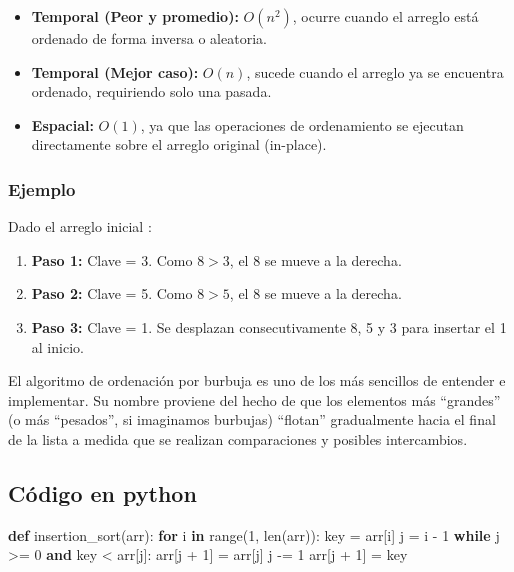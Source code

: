 \documentclass[
  spanish,
  letterpaper,
  DIV=11,
  numbers=noendperiod]{scrreprt}
\newenvironment{Shaded}{\begin{snugshade}}{\end{snugshade}}
\newcommand{\BuiltInTok}[1]{\textcolor[rgb]{0.00,0.23,0.31}{#1}}
\newcommand{\ControlFlowTok}[1]{\textcolor[rgb]{0.00,0.23,0.31}{\textbf{#1}}}
\newcommand{\DecValTok}[1]{\textcolor[rgb]{0.68,0.00,0.00}{#1}}
\newcommand{\KeywordTok}[1]{\textcolor[rgb]{0.00,0.23,0.31}{\textbf{#1}}}
\newcommand{\NormalTok}[1]{\textcolor[rgb]{0.00,0.23,0.31}{#1}}
\newcommand{\OperatorTok}[1]{\textcolor[rgb]{0.37,0.37,0.37}{#1}}
\providecommand{\tightlist}{%
  \setlength{\itemsep}{0pt}\setlength{\parskip}{0pt}}
\begin{document}
\begin{itemize}
\tightlist
\item
  \textbf{Temporal (Peor y promedio):} \(O(n^2)\), ocurre cuando el
  arreglo está ordenado de forma inversa o aleatoria.
\item
  \textbf{Temporal (Mejor caso):} \(O(n)\), sucede cuando el arreglo ya
  se encuentra ordenado, requiriendo solo una pasada.
\item
  \textbf{Espacial:} \(O(1)\), ya que las operaciones de ordenamiento se
  ejecutan directamente sobre el arreglo original (in-place).
\end{itemize}

\subsubsection{\texorpdfstring{\textbf{Ejemplo}}{Ejemplo}}\label{ejemplo-1}

Dado el arreglo inicial :

\begin{enumerate}
\def\labelenumi{\arabic{enumi}.}
\tightlist
\item
  \textbf{Paso 1:} Clave = 3. Como \(8 > 3\), el 8 se mueve a la
  derecha.
\item
  \textbf{Paso 2:} Clave = 5. Como \(8 > 5\), el 8 se mueve a la
  derecha.
\item
  \textbf{Paso 3:} Clave = 1. Se desplazan consecutivamente 8, 5 y 3
  para insertar el 1 al inicio.
\end{enumerate}

El algoritmo de ordenación por burbuja es uno de los más sencillos de
entender e implementar. Su nombre proviene del hecho de que los
elementos más ``grandes'' (o más ``pesados'', si imaginamos burbujas)
``flotan'' gradualmente hacia el final de la lista a medida que se
realizan comparaciones y posibles intercambios.

\subsection{\texorpdfstring{\textbf{Código en
python}}{Código en python}}\label{cuxf3digo-en-python}

\begin{Shaded}
\begin{Highlighting}[]
\KeywordTok{def}\NormalTok{ insertion\_sort(arr):}
    \ControlFlowTok{for}\NormalTok{ i }\KeywordTok{in} \BuiltInTok{range}\NormalTok{(}\DecValTok{1}\NormalTok{, }\BuiltInTok{len}\NormalTok{(arr)):}
\NormalTok{        key }\OperatorTok{=}\NormalTok{ arr[i]}
\NormalTok{        j }\OperatorTok{=}\NormalTok{ i }\OperatorTok{{-}} \DecValTok{1}
        \ControlFlowTok{while}\NormalTok{ j }\OperatorTok{\textgreater{}=} \DecValTok{0} \KeywordTok{and}\NormalTok{ key }\OperatorTok{\textless{}}\NormalTok{ arr[j]:}
\NormalTok{            arr[j }\OperatorTok{+} \DecValTok{1}\NormalTok{] }\OperatorTok{=}\NormalTok{ arr[j]}
\NormalTok{            j }\OperatorTok{{-}=} \DecValTok{1}
\NormalTok{        arr[j }\OperatorTok{+} \DecValTok{1}\NormalTok{] }\OperatorTok{=}\NormalTok{ key}
\end{Highlighting}
\end{Shaded}
\end{document}
